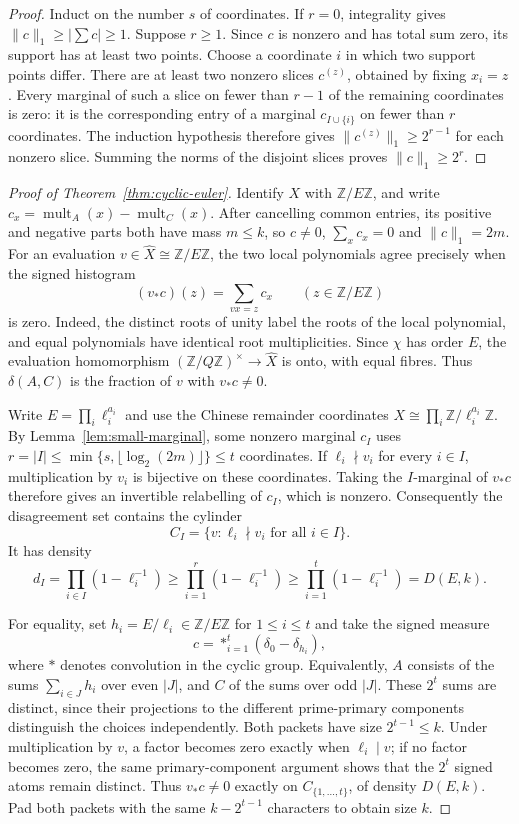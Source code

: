 \documentclass[11pt]{article}
\theoremstyle{definition}
\theoremstyle{remark}
\begin{document}
\begin{proof}
Induct on the number $s$ of coordinates.  If $r=0$, integrality gives
$\|c\|_1\ge|\sum c|\ge1$.  Suppose $r\ge1$.  Since $c$ is nonzero
and has total sum zero, its support has at least two points.  Choose a
coordinate $i$ in which two support points differ.  There are at least
two nonzero slices $c^{(z)}$, obtained by fixing $x_i=z$.  Every marginal
of such a slice on fewer than $r-1$ of the remaining coordinates is
zero: it is the corresponding entry of a marginal $c_{I\cup\{i\}}$
on fewer than $r$ coordinates.  The induction hypothesis therefore
gives $\|c^{(z)}\|_1\ge2^{r-1}$ for each nonzero slice.  Summing the
norms of the disjoint slices proves $\|c\|_1\ge2^r$.
\end{proof}

\begin{proof}[Proof of Theorem~\ref{thm:cyclic-euler}]
Identify $X$ with $\mathbb Z/E\mathbb Z$, and write
$c_x=\operatorname{mult}_A(x)-\operatorname{mult}_C(x)$.
After cancelling common entries, its positive and negative parts both
have mass $m\le k$, so $c\ne0$, $\sum_xc_x=0$ and $\|c\|_1=2m$.
For an evaluation $v\in\widehat X\cong\mathbb Z/E\mathbb Z$,
the two local polynomials agree precisely when the signed histogram
\[
 (v_*c)(z)=\sum_{vx=z}c_x\qquad(z\in\mathbb Z/E\mathbb Z)
\]
is zero.  Indeed, the distinct roots of unity label the roots of the
local polynomial, and equal polynomials have identical root
multiplicities.  Since $\chi$ has order $E$, the evaluation homomorphism
$(\mathbb Z/Q\mathbb Z)^\times\to\widehat X$ is onto, with equal
fibres.  Thus $\delta(A,C)$ is the fraction of $v$ with $v_*c\ne0$.

Write $E=\prod_i\ell_i^{a_i}$ and use the Chinese remainder coordinates
$X\cong\prod_i\mathbb Z/\ell_i^{a_i}\mathbb Z$.  By
Lemma~\ref{lem:small-marginal}, some nonzero marginal $c_I$ uses
$r=|I|\le\min\{s,\lfloor\log_2(2m)\rfloor\}\le t$ coordinates.
If $\ell_i\nmid v_i$ for every $i\in I$, multiplication by $v_i$ is
bijective on these coordinates.  Taking the $I$-marginal of $v_*c$
therefore gives an invertible relabelling of $c_I$, which is nonzero.
Consequently the disagreement set contains the cylinder
\[
 C_I=\{v:\ell_i\nmid v_i\text{ for all }i\in I\}.
\]
It has density
\[
 d_I=\prod_{i\in I}(1-\ell_i^{-1})
 \ge\prod_{i=1}^{r}(1-\ell_i^{-1})
 \ge\prod_{i=1}^{t}(1-\ell_i^{-1})=D(E,k).
\]

For equality, set $h_i=E/\ell_i\in\mathbb Z/E\mathbb Z$ for
$1\le i\le t$ and take the signed measure
\[
 c=\mathop{*}_{i=1}^{t}(\delta_0-\delta_{h_i}),
\]
where $*$ denotes convolution in the cyclic group.  Equivalently,
$A$ consists of the sums $\sum_{i\in J}h_i$ over even $|J|$, and
$C$ of the sums over odd $|J|$.  These $2^t$ sums are distinct, since
their projections to the different prime-primary components distinguish
the choices independently.  Both packets have size $2^{t-1}\le k$.
Under multiplication by $v$, a factor becomes zero exactly when
$\ell_i\mid v$; if no factor becomes zero, the same primary-component
argument shows that the $2^t$ signed atoms remain distinct.  Thus
$v_*c\ne0$ exactly on $C_{\{1,\ldots,t\}}$, of density $D(E,k)$.
Pad both packets with the same $k-2^{t-1}$ characters to obtain size $k$.


\end{proof}
\end{document}
